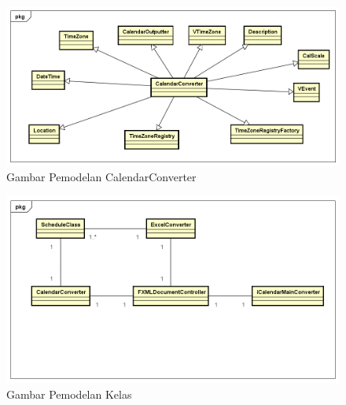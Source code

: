 \begin{figure}[H]
	\centering
	\includegraphics[scale=0.5]{Gambar/pemodelanCalendarConverter}
	\caption{Gambar Pemodelan CalendarConverter}
	\label{fig:pemodelanExcelConverter}
\end{figure}

\begin{figure}[H]
	\centering
	\includegraphics[scale=0.5]{Gambar/pemodelan-kelas}
	\caption{Gambar Pemodelan Kelas}
	\label{fig:pemodelanKelasSeluruh}
\end{figure}

